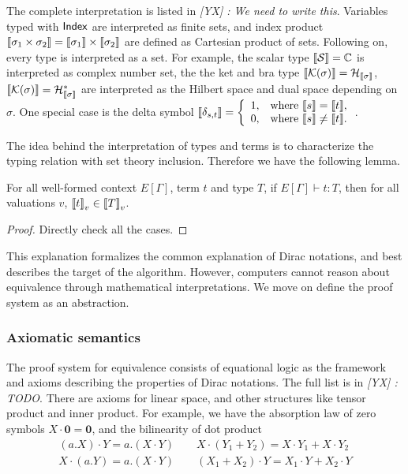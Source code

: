 \documentclass[runningheads]{llncs}
\newcommand{\yx}[1]{\textit{\color{blue}[YX] : #1}}
\begin{document}
The complete interpretation is listed in \yx{We need to write this}.
Variables typed with $\mathsf{Index}$ are interpreted as finite sets, and index product ${\llbracket \sigma_1 \times \sigma_2 \rrbracket} = {\llbracket \sigma_1 \rrbracket} \times {\llbracket \sigma_2 \rrbracket}$ are defined as Cartesian product of sets. Following on, every type is interpreted as a set. For example, the scalar type ${\llbracket \mathcal{S} \rrbracket} = \mathbb{C}$ is interpreted as complex number set, the the ket and bra type ${\llbracket \mathcal{K}(\sigma) \rrbracket} = \mathcal{H}_{{\llbracket \sigma \rrbracket}}$, ${\llbracket \mathcal{K}(\sigma) \rrbracket} = \mathcal{H}_{{\llbracket \sigma \rrbracket}}^*$ are interpreted as the Hilbert space and dual space depending on $\sigma$. One special case is the delta symbol 
${\llbracket \delta_{s, t} \rrbracket} = 
\left \{  
    \begin{array}{ll}
        1, & \text{where } {\llbracket s \rrbracket} = {\llbracket t \rrbracket}, \\
        0, & \text{where } {\llbracket s \rrbracket} \neq {\llbracket t \rrbracket}.
    \end{array} 
\right .
$.

The idea behind the interpretation of types and terms is to characterize the typing relation with set theory inclusion. Therefore we have the following lemma.
\begin{lemma}
    For all well-formed context $E[\Gamma]$, term $t$ and type $T$, if $E[\Gamma]\vdash t : T$, then for all valuations $v$, ${\llbracket t \rrbracket}_v \in {\llbracket T \rrbracket}_v$.
\end{lemma}
\begin{proof}
    Directly check all the cases.
\end{proof}

This explanation formalizes the common explanation of Dirac notations, and best describes the target of the algorithm.
However, computers cannot reason about equivalence through mathematical interpretations. We move on define the proof system as an abstraction.


\subsubsection{Axiomatic semantics} 
The proof system for equivalence consists of equational logic as the framework and axioms describing the properties of Dirac notations.
The full list is in \yx{TODO}.
There are axioms for linear space, and other structures like tensor product and inner product.
For example, we have the absorption law of zero symbols $X \cdot \mathbf{0} = \mathbf{0}$, and the bilinearity of dot product
\begin{align*}
    (a.X) \cdot Y = a.(X \cdot Y) \qquad X \cdot (Y_1 + Y_2) = X \cdot Y_1 + X \cdot Y_2 \\
    X \cdot (a.Y) = a.(X \cdot Y) \qquad (X_1 + X_2) \cdot Y = X_1 \cdot Y + X_2 \cdot Y
\end{align*}
\end{document}
